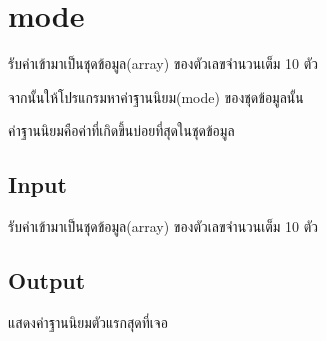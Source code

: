 \documentclass{article}
\begin{document}
\section*{mode}

รับค่าเข้ามาเป็นชุดข้อมูล(array) ของตัวเลขจำนวนเต็ม 10 ตัว

จากนั้นให้โปรแกรมหาค่าฐานนิยม(mode) ของชุดข้อมูลนั้น

ค่าฐานนิยมคือค่าที่เกิดขึ้นบ่อยที่สุดในชุดข้อมูล\\



\subsection*{Input}
{รับค่าเข้ามาเป็นชุดข้อมูล}{(array}{) ของตัวเลขจำนวนเต็ม 10 ตัว}\\



\subsection*{Output}
แสดงค่าฐานนิยมตัวแรกสุดที่เจอ
\end{document}
